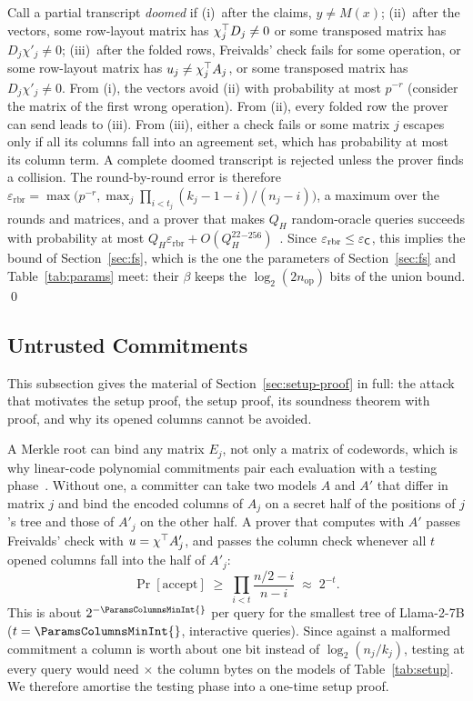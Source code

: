  Call a partial transcript \emph{doomed} if (i)~after the claims,
$y\neq M(x)$; (ii)~after the vectors, some row-layout matrix has $\chi_j^\top D_j\neq0$ or some
transposed matrix has $D_j\chi'_j\neq0$; (iii)~after the folded rows, Freivalds' check fails for some
operation, or some row-layout matrix has $u_j\neq\chi_j^\top A_j$, or some transposed matrix has
$D_j\chi'_j\neq0$. From (i), the vectors avoid (ii) with probability at most $p^{-r}$ (consider the
matrix of the first wrong operation). From (ii), every folded row the prover can send leads to
(iii). From (iii), either a check fails or some matrix $j$ escapes only if all its columns fall into
an agreement set, which has probability at most its column term. A complete doomed transcript is
rejected unless the prover finds a collision. The round-by-round error is therefore
$\varepsilon_{\mathrm{rbr}}=\max\big(p^{-r},\max_j\prod_{i<t_j}(k_j-1-i)/(n_j-i)\big)$, a maximum
over the rounds and matrices, and a prover that makes $Q_H$ random-oracle queries succeeds with
probability at most $Q_H\varepsilon_{\mathrm{rbr}}+O(Q_H^22^{-256})$~\cite{canetti2019fs,bcs16}. Since
$\varepsilon_{\mathrm{rbr}}\le\varepsilon_{\mathsf{C}}$, this implies the bound of Section~\ref{sec:fs},
which is the one the parameters of Section~\ref{sec:fs} and Table~\ref{tab:params} meet: their
$\beta$ keeps the $\log_2(2n_{\mathrm{op}})$ bits of the union bound. \qed

\subsection{Untrusted Commitments}
\label{app:untrusted}

This subsection gives the material of Section~\ref{sec:setup-proof} in full: the attack that
motivates the setup proof, the setup proof, its soundness theorem with proof, and why its opened
columns cannot be avoided.

 A Merkle root can bind any matrix $E_j$, not only a
matrix of codewords, which is why linear-code polynomial commitments pair each evaluation with a
testing phase~\cite{ligero,brakedown}. Without one, a committer can take two models $A$ and $A'$
that differ in matrix $j$ and bind the encoded columns of $A_j$ on a secret half of the positions of
$j$'s tree and those of $A'_j$ on the other half. A prover that
computes with $A'$ passes Freivalds' check with $u=\chi^\top A'_j$, and passes the column check
whenever all $t$ opened columns fall into the half of $A'_j$:
\begin{equation}
  \Pr[\text{accept}] \;\ge\; \prod_{i<t}\frac{n/2-i}{n-i}\;\approx\; 2^{-t}.
  \label{eq:split}
\end{equation}
This is about $2^{-\ParamsColumnsMinInt{}}$ per query for the smallest tree of Llama-2-7B
($t=\ParamsColumnsMinInt{}$, interactive queries). Since against a malformed commitment a column is worth about
one bit instead of $\log_2(n_j/k_j)$, testing at every query would need \SplitColumnFactorRange{}$\times$ the
column bytes on the models of Table~\ref{tab:setup}. We therefore amortise the testing phase into a
one-time setup proof.

